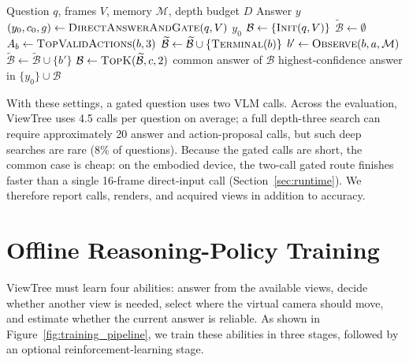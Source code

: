 \documentclass[sigconf,10pt]{acmart}
\newcommand{\system}{ViewTree\xspace}
\begin{document}
	\begin{algorithm}[t]
		\caption{Confidence-guided ViewTree inference}
		\label{alg:viewtree}
		\begin{algorithmic}[1]
			\Require Question $q$, frames $V$, memory $\mathcal{M}$, depth budget $D$
			\Ensure Answer $y$
			\State $(y_0,c_0,g)\gets\textsc{DirectAnswerAndGate}(q,V)$
			\State \Return $y_0$
			\EndIf
			\State $\mathcal{B}\gets\{\textsc{Init}(q,V)\}$
			\State $\widetilde{\mathcal{B}}\gets\emptyset$
			\State $A_b\gets\textsc{TopValidActions}(b,3)$
			\State $\widetilde{\mathcal{B}}\gets
			\widetilde{\mathcal{B}}\cup\{\textsc{Terminal}(b)\}$
			\Else
			\State $b'\gets\textsc{Observe}(b,a,\mathcal{M})$
			\State $\widetilde{\mathcal{B}}\gets
			\widetilde{\mathcal{B}}\cup\{b'\}$
			\EndIf
			\EndFor
			\EndFor
			\State $\mathcal{B}\gets\textsc{TopK}(\widetilde{\mathcal{B}},c,2)$
			\State \Return common answer of $\mathcal{B}$
			\EndIf
			\EndFor
			\State \Return highest-confidence answer in $\{y_0\}\cup\mathcal{B}$
		\end{algorithmic}
	\end{algorithm}
	
	With these settings, a gated question uses two VLM calls. Across the evaluation, \system uses 4.5 calls per question on average; a full depth-three search can require approximately 20 answer and action-proposal calls, but such deep searches are rare (8\% of questions). Because the gated calls are short, the common case is cheap: on the embodied device, the two-call gated route finishes faster than a single 16-frame direct-input call (Section~\ref{sec:runtime}). We therefore report calls, renders, and acquired views in addition to accuracy.
	
	\section{Offline Reasoning-Policy Training}
	\label{sec:training}
	
	ViewTree must learn four abilities: answer from the available views, decide whether another view is needed, select where the virtual camera should move, and estimate whether the current answer is reliable. As shown in Figure~\ref{fig:training_pipeline}, we train these abilities in three stages, followed by an optional reinforcement-learning stage.
\end{document}
